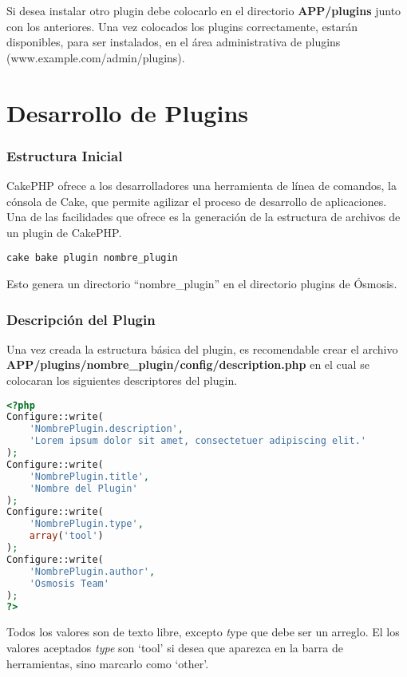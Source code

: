 Si desea instalar otro plugin debe colocarlo en el directorio \textbf{APP/plugins} junto con los anteriores. Una vez colocados los plugins correctamente, estarán disponibles, para ser instalados, en el área administrativa de plugins (www.example.com/admin/plugins). \\

\section{Desarrollo de Plugins}

\subsubsection{Estructura Inicial}
CakePHP ofrece a los desarrolladores una herramienta de línea de comandos, la cónsola de Cake, que permite agilizar el proceso de desarrollo de aplicaciones. Una de las facilidades que ofrece es la generación de la estructura de archivos de un plugin de CakePHP.

\begin{lstlisting}
cake bake plugin nombre_plugin
\end{lstlisting}

Esto genera un directorio ``nombre\_plugin'' en el directorio plugins de Ósmosis.

\subsubsection{Descripción del Plugin}
Una vez creada la estructura básica del plugin, es recomendable crear el archivo \textbf{APP/plugins/nombre\_plugin/config/description.php} en el cual se colocaran los siguientes descriptores del plugin.\\

\begin{lstlisting}[language=PHP]
<?php
Configure::write(
	'NombrePlugin.description',
	'Lorem ipsum dolor sit amet, consectetuer adipiscing elit.'
);
Configure::write(
	'NombrePlugin.title',
	'Nombre del Plugin'
);
Configure::write(
	'NombrePlugin.type',
	array('tool')
);
Configure::write(
	'NombrePlugin.author',
	'Osmosis Team'
);
?>
\end{lstlisting}

Todos los valores son de texto libre, excepto \emph type que debe ser un arreglo. El los valores aceptados \emph{type} son `tool' si desea que aparezca en la barra de herramientas, sino marcarlo como `other'.\\

